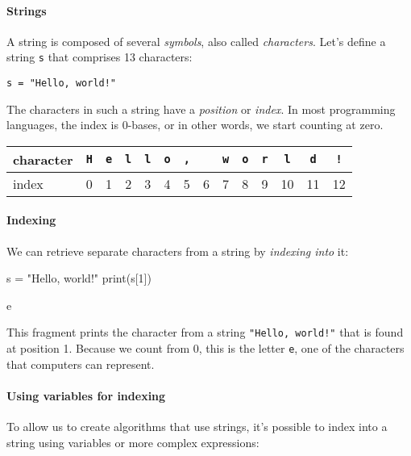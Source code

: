 \paragraph{Strings} A string is composed of several \emph{symbols}, also called \emph{characters}. Let's define a string \texttt{s} that comprises 13 characters:

\begin{verbatim}
s = "Hello, world!"
\end{verbatim}

The characters in such a string have a \emph{position} or \emph{index}. In most programming languages, the index is 0-bases, or in other words, we start counting at zero.

\begin{tabular}{l|ccccccccccccc}
character&\texttt{H}&\texttt{e}&\texttt{l}&\texttt{l}&\texttt{o}&\texttt{,}&\texttt{ }&\texttt{w}&\texttt{o}&\texttt{r}&\texttt{l}&\texttt{d}&\texttt{!}\\
\hline
index&0&1&2&3&4& 5&6&7&8&9& 10&11&12 \\
\end{tabular}

\paragraph{Indexing}

We can retrieve separate characters from a string by \emph{indexing into} it:

\begin{minipage}[t]{0.5\textwidth}
\begin{listing}
s = "Hello, world!"
print(s[1])
\end{listing}
\end{minipage}%
\begin{minipage}[t]{0.5\textwidth}
\begin{listing}
e
\end{listing}
\end{minipage}

This fragment prints the character from a string \texttt{"Hello, world!"} that is found at position 1. Because we count from 0, this is the letter \texttt{e}, one of the characters that computers can represent.

\paragraph{Using variables for indexing}

To allow us to create algorithms that use strings, it's possible to index into a string using variables or more complex expressions:

